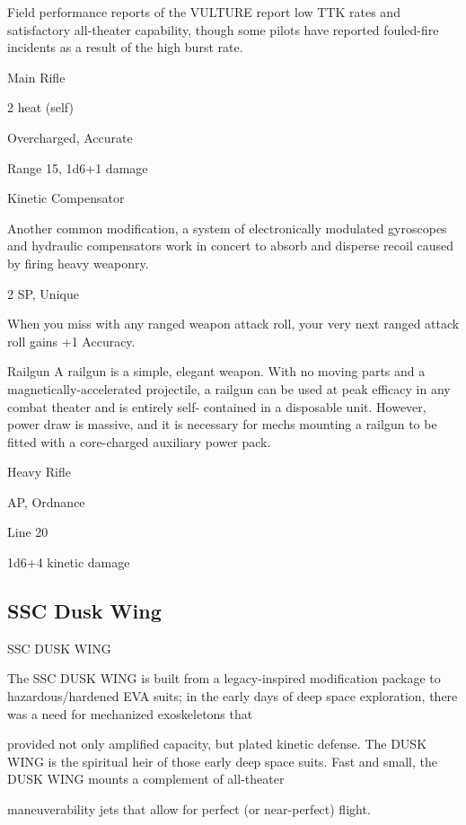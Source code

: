 Field performance reports of the VULTURE report low TTK rates and satisfactory all-theater capability,  
though some pilots have reported fouled-fire incidents as a result of the high burst rate.   

Main Rifle
 
2 heat (self)
 
Overcharged, Accurate
 
Range 15, 1d6+1 damage
 

Kinetic Compensator
 
Another common modification, a system of electronically modulated gyroscopes and hydraulic  
compensators work in concert to absorb and disperse recoil caused by firing heavy weaponry.   

2 SP, Unique
 
When you miss with any ranged weapon attack roll, your very next ranged attack roll gains +1  
Accuracy.
 

Railgun  
A railgun is a simple, elegant weapon. With no moving parts and a magnetically-accelerated  
projectile, a railgun can be used at peak efficacy in any combat theater and is entirely self- 
contained in a disposable unit. However, power draw is massive, and it is necessary for mechs  
mounting a railgun to be fitted with a core-charged auxiliary power pack.   
   
Heavy Rifle
 
AP, Ordnance
 
Line 20
 
1d6+4 kinetic damage
 

                                                                                                                  
\subsection{SSC Dusk Wing}

                                           SSC DUSK WING  

The SSC DUSK WING is built from a legacy-inspired modification package to hazardous/hardened EVA  
suits; in the early days of deep space exploration, there was a need for mechanized exoskeletons that  

provided not only amplified capacity, but plated kinetic defense. The DUSK WING is the spiritual heir of  
those early deep space suits. Fast and small, the DUSK WING mounts a complement of all-theater  

maneuverability jets that allow for perfect (or near-perfect) flight.    

